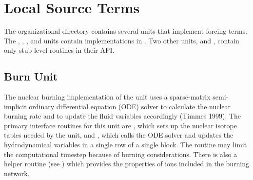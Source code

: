 \chapter{Local Source Terms}
\label{Sec:source terms}

The  organizational directory contains several units 
that implement forcing terms.  The , , , and
 units contain implementations in \flashx.  Two other units,
 and , contain only stub level routines in their API.

\section{Burn Unit}
\label{Sec:burn}

The nuclear burning implementation of the  unit uses a
sparse-matrix semi-implicit ordinary differential equation (ODE)
solver to calculate the nuclear burning rate and to update the fluid
variables accordingly (Timmes 1999). The primary interface routines
for this unit are , which
sets up the nuclear isotope tables needed by the
unit, and , which
calls the ODE solver and updates the hydrodynamical variables in a
single row of a single block.
The routine  may limit the computational timestep because of burning considerations.
There is also a helper routine 
(see )
which provides the properties of ions included in the burning network.


